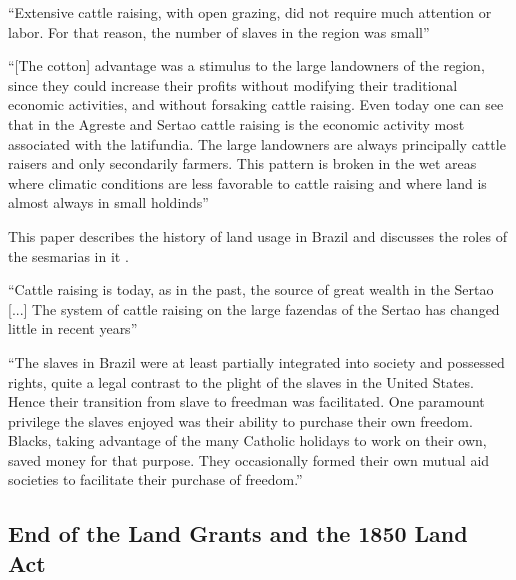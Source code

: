 \documentclass{article}
\begin{document}
\textcite{Diegues_Junior1959-ba}



\textcite[p.~113]{De_Oliveira_Andrade1980-xz}
``Extensive cattle raising, with open grazing, did not require much attention or labor. For that reason, the number of slaves in the region was small''

\textcite[p.~119]{De_Oliveira_Andrade1980-xz}
``[The cotton] advantage was a stimulus to the large landowners of the region, since they could increase their profits without modifying their traditional economic activities, and without forsaking cattle raising. Even today one can see that in the Agreste and Sertao cattle raising is the economic activity most associated with the latifundia. The large landowners are always principally cattle raisers and only secondarily farmers. This pattern is broken in the wet areas where climatic conditions are less favorable to cattle raising and where land is almost always in small holdinds''

This paper describes the history of land usage in Brazil and discusses the roles of the sesmarias in it \parencite{Reydon2015-ff}.

\textcite[p.~157]{De_Oliveira_Andrade1980-xz}
``Cattle raising is today, as in the past, the source of great wealth in the Sertao [...] The system of cattle raising on the large fazendas of the Sertao has changed little in recent years''

``The slaves in Brazil were at least partially integrated into society and possessed rights, quite a legal contrast to the plight of the slaves in the United States. Hence their transition from slave to freedman was facilitated. One paramount privilege the slaves enjoyed was their ability to purchase their own freedom. Blacks, taking advantage of the many Catholic holidays to work on their own, saved money for that purpose. They occasionally formed their own mutual aid societies to facilitate their purchase of freedom.''

\subsection{End of the Land Grants and the 1850 Land Act}
\end{document}
